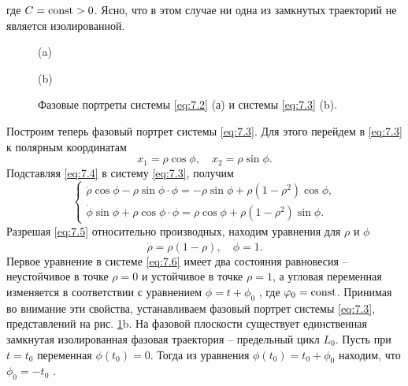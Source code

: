 где $C= \textrm{const}>0$. Ясно, что в этом случае ни одна из замкнутых траекторий не является изолированной.
\begin{figure}[h]
        \centering
        \begin{minipage}{0.49\linewidth}
                \centering
                (a)
        \end{minipage}
        \begin{minipage}{0.49\linewidth}
                \centering
                (b)
        \end{minipage}
        \caption{Фазовые портреты системы \eqref{eq:7.2} (а) и системы \eqref{eq:7.3} (b).}
        \label{fig:7.1}
\end{figure}
Построим теперь фазовый портрет системы \eqref{eq:7.3}. Для этого перейдем в \eqref{eq:7.3} к полярным координатам
\begin{equation}
        \label{eq:7.4}
        x_1 = \rho \cos \phi, \quad x_2 = \rho \sin \phi.
\end{equation}
Подставляя \eqref{eq:7.4} в систему \eqref{eq:7.3}, получим
\begin{equation}
        \label{eq:7.5}
        \begin{cases}
                \dot \rho \cos \phi - \rho \sin \phi \cdot \phi = - \rho \sin \phi + \rho(1-\rho^2)\cos \phi,\\
                \dot \phi \sin \phi + \rho \cos \phi \cdot \phi = \rho \cos \phi + \rho(1-\rho^2)\sin \phi.
        \end{cases}
\end{equation}
Разрешая \eqref{eq:7.5} относительно производных, находим уравнения для $\rho$ и $\phi$
 \begin{equation}
        \label{eq:7.6}
        \dot \rho = \rho(1-\rho),\quad \dot \phi =1.
\end{equation}
Первое уравнение в системе \eqref{eq:7.6} имеет два состояния равновесия --
неустойчивое в точке  $\rho=0$ и устойчивое в точке $\rho=1$, а угловая переменная
изменяется в соответствии с уравнением $\phi = t + \phi_0$ , где $\varphi_0= \textrm{const}$. Принимая во
внимание эти свойства, устанавливаем фазовый портрет системы \eqref{eq:7.3},
представлений на рис. \ref{fig:7.1}b. На фазовой плоскости существует единственная
замкнутая изолированная фазовая траектория – предельный цикл $L_0$. Пусть при
$t=t_0$ переменная $\phi(t_0)=0$. Тогда из уравнения $\phi(t_0)= t_0+ \phi_0$ находим, что $\phi_0=-t_0$ .
